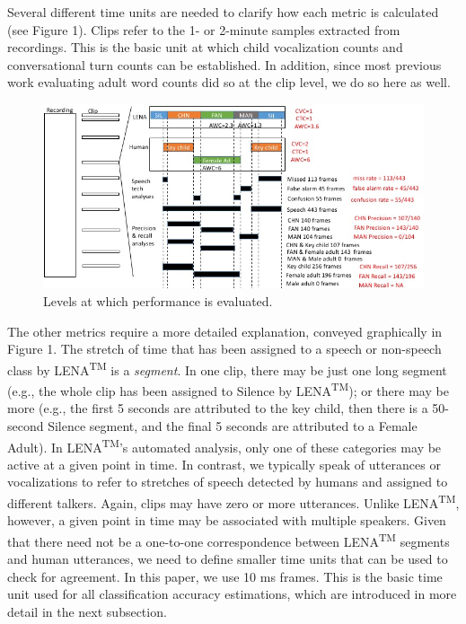 \documentclass[english,floatsintext,man]{apa6}
\begin{document}
Several different time units are needed to clarify how each metric is
calculated (see Figure 1). Clips refer to the 1- or 2-minute samples
extracted from recordings. This is the basic unit at which child
vocalization counts and conversational turn counts can be established.
In addition, since most previous work evaluating adult word counts did
so at the clip level, we do so here as well.

\begin{figure}
\centering
\includegraphics{fig_levels.jpg}
\caption{Levels at which performance is evaluated.}
\end{figure}

The other metrics require a more detailed explanation, conveyed
graphically in Figure 1. The stretch of time that has been assigned to a
speech or non-speech class by LENA\textsuperscript{TM} is a
\emph{segment}. In one clip, there may be just one long segment (e.g.,
the whole clip has been assigned to Silence by
LENA\textsuperscript{TM}); or there may be more (e.g., the first 5
seconds are attributed to the key child, then there is a 50-second
Silence segment, and the final 5 seconds are attributed to a Female
Adult). In LENA\textsuperscript{TM}'s automated analysis, only one of
these categories may be active at a given point in time. In contrast, we
typically speak of utterances or vocalizations to refer to stretches of
speech detected by humans and assigned to different talkers. Again,
clips may have zero or more utterances. Unlike LENA\textsuperscript{TM},
however, a given point in time may be associated with multiple speakers.
Given that there need not be a one-to-one correspondence between
LENA\textsuperscript{TM} segments and human utterances, we need to
define smaller time units that can be used to check for agreement. In
this paper, we use 10 ms frames. This is the basic time unit used for
all classification accuracy estimations, which are introduced in more
detail in the next subsection.
\end{document}
